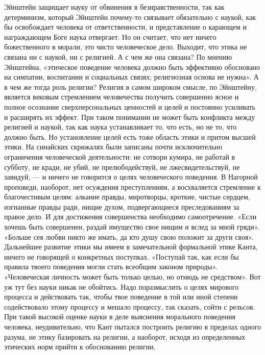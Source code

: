 Эйнштейн  защищает   науку  от  обвинения  в   безнравственности,  так
как  детерминизм,  который  Эйнштейн почему-то  связывает  обязательно
с  наукой,   как  бы   освобождает  человека  от   ответственности,  и
представление о  карающем и награждающем  Боге наука отвергает.  Но он
считает, что нет ничего божественного в морали, это чисто человеческое
дело. Выходит,  что этика  не связана  ни с наукой,  ни с  религией. А
с  чем  же она  связана?  По  мнению Эйнштейна,  «этическое  поведение
человека должно  быть эффективно обосновано на  симпатии, воспитании и
социальных связях; религиозная основа не нужна». А в чем же тогда роль
религии?  Религия  в  самом  широком смысле,  по  Эйнштейну,  является
вековым стремлением  человечества получить  совершенно ясное  и полное
осознание сверхперсональных ценностей и  целей и постоянно усиливать и
расширять их эффект. При таком понимании не может быть конфликта между
религией  и наукой,  так  как  наука устанавливает  то,  что есть,  но
не  то, что  должно  быть.  Но установление  целей  есть тоже  область
этики  и притом  высшей этики.  На синайских  скрижалях были  записаны
почти исключительно ограничения  человеческой деятельности: не сотвори
кумира, не работай  в субботу, не кради, не  убий, не прелюбодействуй,
не лжесвидетельствуй,  не завидуй, ---  и ничего не говорится  о целях
человеческого поведения. В Нагорной проповеди, наоборот, нет осуждения
преступлениям,  а  восхваляется   стремление  к  благочестивым  целям:
алкание правды, миротворцы, кроткие,  чистые сердцем, изгнанные правды
ради, нищие духом, подвергающиеся преследованиям за правое дело. И для
достижения  совершенства необходимо  самоотречение. «Если  хочешь быть
совершенен,  раздай  имущество свое  нищим  и  вслед за  мной  гряди».
«Больше сея  любви никто же имать,  да кто душу свою  положит за други
своя». Дальнейшее  развитие этики мы имеем  в замечательной формальной
этике  Канта, ничего  не говорящей  о конкретных  поступках. «Поступай
так, как если бы правила твоего поведения могли стать всеобщим законом
природы». «Человеческая личность может быть только целью, но отнюдь не
средством». Вот уж тут без  науки никак не обойтись. Надо поразмыслить
о целях  мирового процесса и  действовать так, чтобы твое  поведение в
той или иной  степени содействовало этому процессу  и мешало процессу,
так  сказать,  сойти с  рельсов.  При  такой  высокой оценке  науки  в
деле  выяснения  морального  поведения  человека,  неудивительно,  что
Кант  пытался построить  религию в  пределах одного  разума, не  этику
базировать на  религии, а  наоборот, исходя из  определенных этических
норм прийти к обоснованию религии.

